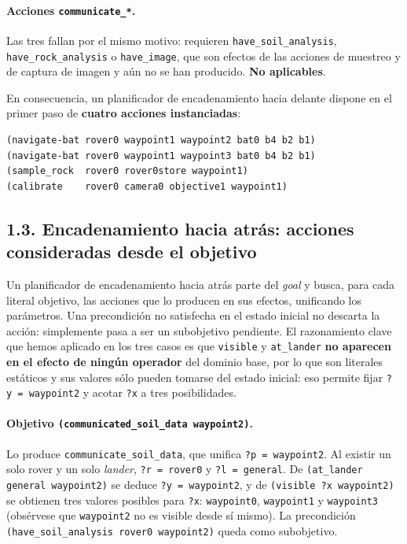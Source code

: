 \documentclass[12pt,a4paper]{article}
\begin{document}
\paragraph{Acciones \texttt{communicate\_*}.}
Las tres fallan por el mismo motivo: requieren
\texttt{have\_soil\_analysis}, \texttt{have\_rock\_analysis} o
\texttt{have\_image}, que son efectos de las acciones de muestreo y de
captura de imagen y a\'un no se han producido. \textbf{No aplicables}.

\medskip
En consecuencia, un planificador de encadenamiento hacia delante dispone en
el primer paso de \textbf{cuatro acciones instanciadas}:

\begin{lstlisting}
(navigate-bat rover0 waypoint1 waypoint2 bat0 b4 b2 b1)
(navigate-bat rover0 waypoint1 waypoint3 bat0 b4 b2 b1)
(sample_rock  rover0 rover0store waypoint1)
(calibrate    rover0 camera0 objective1 waypoint1)
\end{lstlisting}

\subsection{1.3. Encadenamiento hacia atr\'as: acciones consideradas desde
el objetivo}

Un planificador de encadenamiento hacia atr\'as parte del \emph{goal} y
busca, para cada literal objetivo, las acciones que lo producen en sus
efectos, unificando los par\'ametros. Una precondici\'on no satisfecha en el
estado inicial no descarta la acci\'on: simplemente pasa a ser un
subobjetivo pendiente. El razonamiento clave que hemos aplicado en los tres
casos es que \texttt{visible} y \texttt{at\_lander} \textbf{no aparecen en
el efecto de ning\'un operador} del dominio base, por lo que son
literales est\'aticos y sus valores s\'olo pueden tomarse del estado
inicial: eso permite fijar \texttt{?y\,=\,waypoint2} y acotar \texttt{?x} a
tres posibilidades.

\paragraph{Objetivo \texttt{(communicated\_soil\_data waypoint2)}.}
Lo produce \texttt{communicate\_soil\_data}, que unifica
\texttt{?p\,=\,waypoint2}. Al existir un solo rover y un solo \emph{lander},
\texttt{?r\,=\,rover0} y \texttt{?l\,=\,general}. De
\texttt{(at\_lander general waypoint2)} se deduce \texttt{?y\,=\,waypoint2},
y de \texttt{(visible ?x waypoint2)} se obtienen tres valores posibles para
\texttt{?x}: \texttt{waypoint0}, \texttt{waypoint1} y \texttt{waypoint3}
(obs\'ervese que \texttt{waypoint2} no es visible desde s\'i mismo). La
precondici\'on \texttt{(have\_soil\_analysis rover0 waypoint2)} queda como
subobjetivo.
\end{document}
